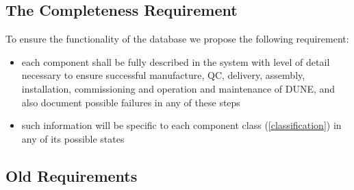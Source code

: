 \documentclass[pdftex,12pt,letter]{article}
\begin{document}



\subsection{The Completeness Requirement}

To ensure the functionality of the database we propose the following requirement:
\begin{itemize}
\item each component shall be fully described in the system with level of detail necessary to
ensure successful manufacture, QC, delivery, assembly, installation, commissioning
and operation and maintenance of DUNE, and also document possible failures in any of these steps

\item such information will be specific to each component class (\ref{classification}) in any of its possible states

\end{itemize}


\subsection{Old Requirements}
\end{document}
